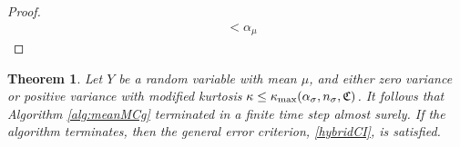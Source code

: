 \documentclass{iitthesis}
\newtheorem{theorem}{Theorem}[section]
\newtheorem{lemma}[theorem]{Lemma}
\theoremstyle{definition}
\begin{document}
\begin{proof}
\begin{align*}
&<\alpha_\mu
\end{align*}
\end{proof}
\begin{theorem}\label{thm:meanMCg}
Let $Y$ be a random variable with mean $\mu$, and either zero variance or positive variance with modified kurtosis $\kappa \leq \kappa_{\max}(\alpha_\sigma, n_\sigma, \mathfrak{C})$. It follows that Algorithm \ref{alg:meanMCg} terminated in a finite time step almost surely. If the algorithm terminates, then the general error criterion, \eqref{hybridCI}, is satisfied.
\end{theorem}
\end{document}
